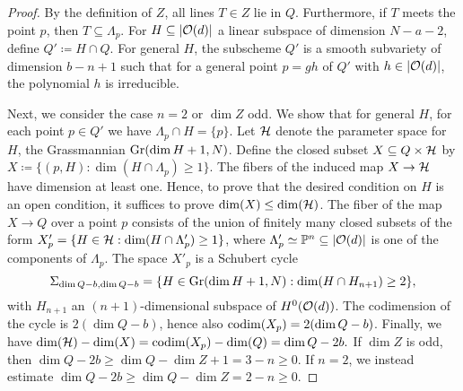 \begin{proof}

	By the definition of $Z$, all lines $T\in Z$ lie in $Q$. Furthermore, if $T$ meets the point $p$, then $T\subseteq \Lambda_p$.
	For $H\subseteq\lvert\mathcal{O}(d)\rvert$ a linear subspace of dimension $N-a-2$, define $Q'\coloneqq H\cap Q$. For general $H$, the subscheme $Q'$ is a smooth subvariety of dimension $b-n+1$ such that for a general point $p=gh$ of $Q'$ with $h\in \lvert\mathcal{O}(d)\rvert$, the polynomial $h$ is irreducible.


	Next, we consider the case $n=2$ or $\dim Z$ odd. We show that for general $H$, for each point $p\in Q'$ we have $\Lambda_p \cap H =\{p\}$. Let $\mathcal{H}$ denote the parameter space for $H$, \ie the Grassmannian $\operatorname{Gr}(\dim H+1, N)$. Define the closed subset $X\subseteq Q\times \mathcal{H}$ by
	$X\coloneqq \{(p,H):\dim(H\cap \Lambda_p)\geq 1\}$. The fibers of the induced map $X\to \mathcal{H}$ have dimension at least one. Hence, to prove that the desired condition on $H$ is an open condition, it suffices to prove $\dim(X) \leq \dim(\mathcal{H})$. The fiber of the map  $X\to Q$ over a point $p$ consists of the union of finitely many closed subsets of the form $X'_p = \{H\in \mathcal{H} : \dim(H\cap \Lambda'_p)\geq 1\}$, where $\Lambda'_p\simeq \mathbb{P}^n\subseteq \lvert\mathcal{O}(d)\rvert$ is one of the components of $\Lambda_p$. The space $X'_p$ is a Schubert cycle
	\[
		\Sigma_{\dim Q - b,\dim Q - b} = \{H\in \operatorname{Gr}(\dim H+1, N) : \dim(H \cap H_{n+1}) \geq 2\},
	\]
	with $H_{n+1}$ an $(n+1)$-dimensional subspace of $H^0(\mathcal{O}(d))$. The codimension of the cycle is $2(\dim Q - b)$, hence also $\operatorname{codim}(X_p) = 2(\dim Q -b)$. Finally, we have $\dim(\mathcal{H})-\dim(X) = \operatorname{codim}(X_p) - \dim(Q) = \dim Q - 2b.$
	If $\dim Z$ is odd, then $\dim Q - 2b \geq \dim Q - \dim Z + 1 = 3-n\geq 0$. If $n=2$, we instead estimate $\dim Q - 2b \geq \dim Q - \dim Z = 2-n\geq 0$.


\end{proof}

